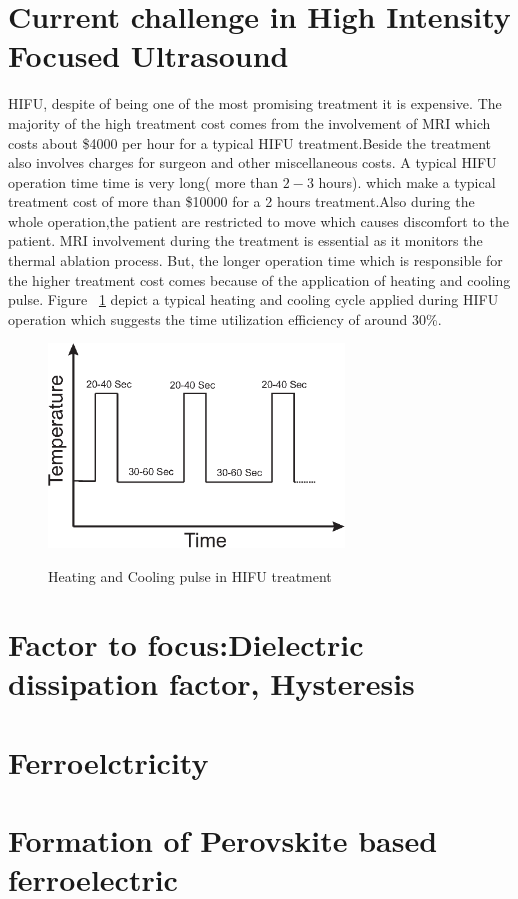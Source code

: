 \section{Current challenge in High Intensity Focused Ultrasound}
HIFU, despite of being one of the most promising treatment it is expensive. The majority of the high treatment cost comes from the involvement of MRI which costs about \$4000 per hour for a typical HIFU treatment.Beside the treatment also involves charges for surgeon and other miscellaneous costs. A typical HIFU operation time time is very long( more than $2-3$ hours).  which make a typical treatment cost of more than \$10000 for a 2 hours treatment.Also during the whole operation,the patient are restricted to move which causes discomfort to the patient. MRI involvement during the treatment is essential as it monitors the thermal ablation process. But, the longer operation time which is responsible for the higher treatment cost comes because of the application of heating and cooling pulse. Figure ~\ref{fig:Heating and Cooling pulse in HIFU treatment} depict a typical heating and cooling cycle applied during HIFU operation which suggests the time utilization efficiency of around $30$\%. 
 
\begin{figure}[t]
\centering
	\includegraphics[width=0.7\textwidth]{HeatingandCoolingpulse.eps}\\
	\caption[Heating and Cooling pulse in HIFU treatment]{Heating and Cooling pulse in HIFU treatment}\label{fig:Heating and Cooling pulse in HIFU treatment}
\end{figure}
\section{Factor to focus:Dielectric dissipation factor, Hysteresis}
\section{Ferroelctricity}
\section{Formation of Perovskite based ferroelectric}

